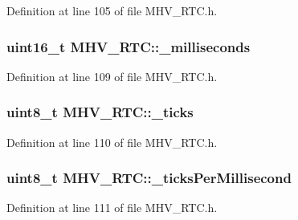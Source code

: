 \-Definition at line 105 of file \-M\-H\-V\-\_\-\-R\-T\-C.\-h.

\hypertarget{class_m_h_v___r_t_c_acd3e486b5e5ee1d8cf9d961c0fdbde57}{
\subsubsection[{\-\_\-milliseconds}]{\setlength{\rightskip}{0pt plus 5cm}uint16\-\_\-t {\bf \-M\-H\-V\-\_\-\-R\-T\-C\-::\-\_\-milliseconds}}}
\label{class_m_h_v___r_t_c_acd3e486b5e5ee1d8cf9d961c0fdbde57}


\-Definition at line 109 of file \-M\-H\-V\-\_\-\-R\-T\-C.\-h.

\hypertarget{class_m_h_v___r_t_c_ab29c30f80f7234394299476c73f36baf}{
\subsubsection[{\-\_\-ticks}]{\setlength{\rightskip}{0pt plus 5cm}uint8\-\_\-t {\bf \-M\-H\-V\-\_\-\-R\-T\-C\-::\-\_\-ticks}}}
\label{class_m_h_v___r_t_c_ab29c30f80f7234394299476c73f36baf}


\-Definition at line 110 of file \-M\-H\-V\-\_\-\-R\-T\-C.\-h.

\hypertarget{class_m_h_v___r_t_c_a48e7d03e90e78881ed8833d6e4f77b36}{
\subsubsection[{\-\_\-ticks\-Per\-Millisecond}]{\setlength{\rightskip}{0pt plus 5cm}uint8\-\_\-t {\bf \-M\-H\-V\-\_\-\-R\-T\-C\-::\-\_\-ticks\-Per\-Millisecond}}}
\label{class_m_h_v___r_t_c_a48e7d03e90e78881ed8833d6e4f77b36}


\-Definition at line 111 of file \-M\-H\-V\-\_\-\-R\-T\-C.\-h.

